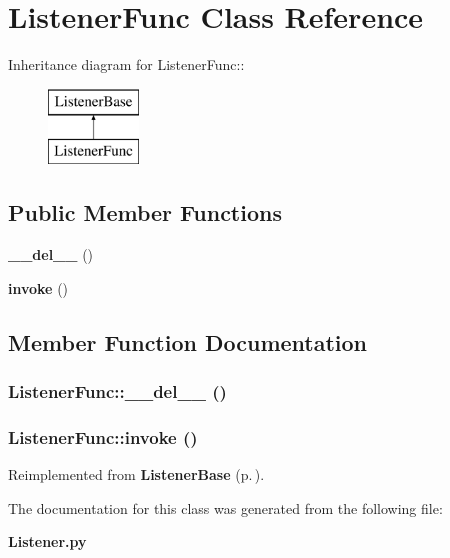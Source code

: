 \section{Listener\-Func Class Reference}
\label{classListenerFunc}
Inheritance diagram for Listener\-Func::\begin{figure}[H]
\begin{center}
\leavevmode
\includegraphics[height=2cm]{classListenerFunc}
\end{center}
\end{figure}
\subsection*{Public Member Functions}
\begin{CompactItemize}
\item 
{\bf \_\-\_\-del\_\-\_\-} ()
\item 
{\bf invoke} ()
\end{CompactItemize}


\subsection{Member Function Documentation}
\subsubsection{\setlength{\rightskip}{0pt plus 5cm}Listener\-Func::\_\-\_\-del\_\-\_\- ()}\label{classListenerFunc_ListenerFunca0}


\subsubsection{\setlength{\rightskip}{0pt plus 5cm}Listener\-Func::invoke ()}\label{classListenerFunc_ListenerFunca1}




Reimplemented from {\bf Listener\-Base} {\rm (p.\,\pageref{classListenerBase_ListenerBasea0})}.

The documentation for this class was generated from the following file:\begin{CompactItemize}
\item 
{\bf Listener.py}\end{CompactItemize}
